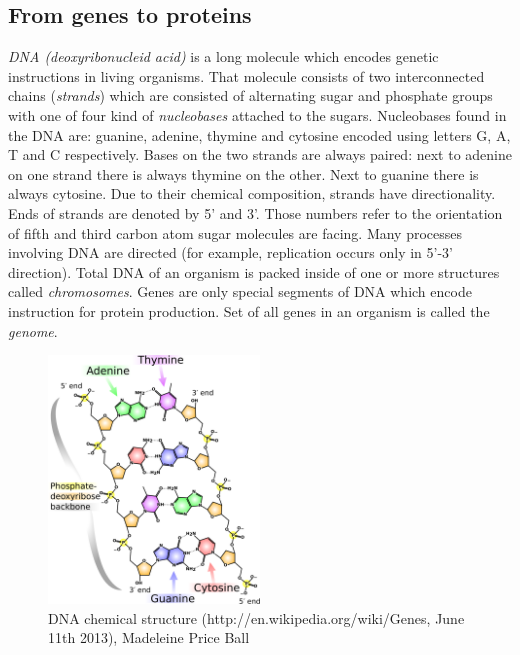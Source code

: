 \documentclass[times, utf8, diplomski]{fer}
\begin{document}
\subsection{From genes to proteins}

\emph{DNA (deoxyribonucleid acid)} is a long molecule which encodes genetic instructions in living organisms. That molecule consists of two interconnected chains (\emph{strands}) which are consisted of alternating sugar and phosphate groups with one of four kind of \emph{nucleobases} attached to the sugars. Nucleobases found in the DNA are: guanine, adenine, thymine and cytosine encoded using letters G, A, T and C respectively. Bases on the two strands are always paired: next to adenine on one strand there is always thymine on the other. Next to guanine there is always cytosine. Due to their chemical composition, strands have directionality. Ends of strands are denoted by 5' and 3'. Those numbers refer to the orientation of fifth and third carbon atom sugar molecules are facing. Many processes involving DNA are directed (for example, replication occurs only in 5'-3' direction). Total DNA of an organism is packed inside of one or more structures called \emph{chromosomes}. Genes are only special segments of DNA which encode instruction for protein production. Set of all genes in an organism is called the \emph{genome}.
\\

\begin{figure}[!ht]
\begin{center}
	\includegraphics[width=0.5\textwidth]{../img/DNA_chemical_structure.pdf}
	\caption{DNA chemical structure (http://en.wikipedia.org/wiki/Genes, June 11th 2013), Madeleine Price Ball}\label{dna.chemical.structure}
\end{center}
\end{figure}
\end{document}
